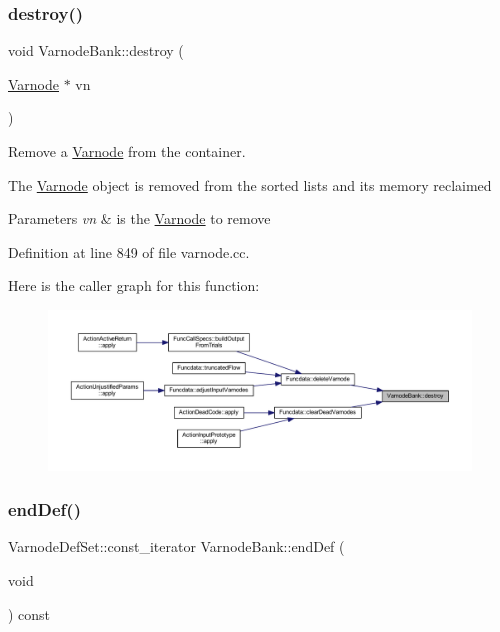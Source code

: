 \subsubsection{\texorpdfstring{destroy()}{destroy()}}
{\footnotesize\ttfamily void Varnode\+Bank\+::destroy (\begin{DoxyParamCaption}\item[{\mbox{\hyperlink{class_varnode}{Varnode}} $\ast$}]{vn }\end{DoxyParamCaption})}



Remove a \mbox{\hyperlink{class_varnode}{Varnode}} from the container. 

The \mbox{\hyperlink{class_varnode}{Varnode}} object is removed from the sorted lists and its memory reclaimed 
\begin{DoxyParams}{Parameters}
{\em vn} & is the \mbox{\hyperlink{class_varnode}{Varnode}} to remove \\
\hline
\end{DoxyParams}


Definition at line 849 of file varnode.\+cc.

Here is the caller graph for this function\+:
\nopagebreak
\begin{figure}[H]
\begin{center}
\leavevmode
\includegraphics[width=350pt]{class_varnode_bank_abec625ab3cf6d593cf8edc7955e5a414_icgraph}
\end{center}
\end{figure}
\mbox{\label{class_varnode_bank_a47fdb654fdb22a784fe2d4924ea7d75d}} 
\subsubsection{\texorpdfstring{endDef()}{endDef()}\hspace{0.1cm}{\footnotesize\ttfamily [1/3]}}
{\footnotesize\ttfamily Varnode\+Def\+Set\+::const\+\_\+iterator Varnode\+Bank\+::end\+Def (\begin{DoxyParamCaption}\item[{void}]{ }\end{DoxyParamCaption}) const\hspace{0.3cm}{\ttfamily [inline]}}



